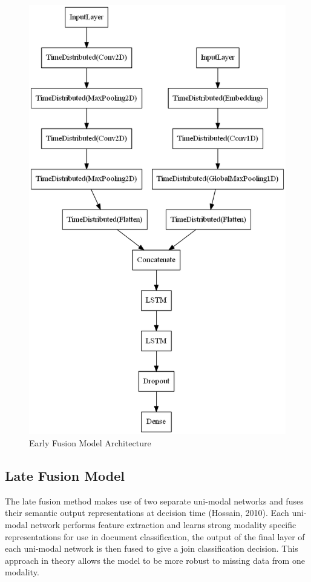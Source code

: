 \documentclass[a4paper,12pt]{article}
\begin{document}
\begin{figure}[H]
\caption{Early Fusion Model Architecture}
\includegraphics[scale=0.35]{early_fusion_model.png}
\centering
\end{figure}

\subsection{Late Fusion Model}
The late fusion method makes use of two separate uni-modal networks and fuses their semantic output representations at decision time (Hossain, 2010). Each uni-modal network performs feature extraction and learns strong modality specific representations for use in document classification, the output of the final layer of each uni-modal network is then fused to give a join classification decision. This approach in theory allows the model to be more robust to missing data from one modality.\\
\end{document}
